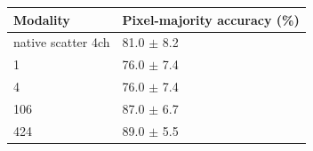 \begin{tabular}{ll}
\toprule
Modality & Pixel-majority accuracy (\%) \\
\midrule
native scatter 4ch & 81.0 $\pm$ 8.2 \\
1 & 76.0 $\pm$ 7.4 \\
4 & 76.0 $\pm$ 7.4 \\
106 & 87.0 $\pm$ 6.7 \\
424 & 89.0 $\pm$ 5.5 \\
\bottomrule
\end{tabular}
